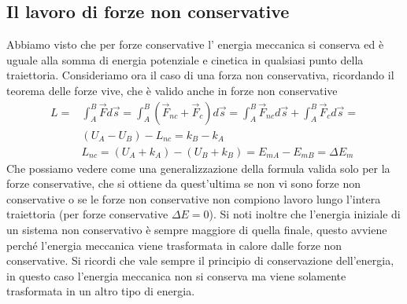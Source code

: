 \documentclass[10pt,a4paper]{article}
\begin{document}
\subsection{Il lavoro di forze non conservative}
Abbiamo visto che per forze conservative l' energia meccanica si conserva ed è uguale alla somma di energia potenziale e cinetica in qualsiasi punto della traiettoria. Consideriamo ora il caso di una forza non conservativa, ricordando il teorema delle forze vive, che è valido anche in forze non conservative
\begin{align*}
	L =& \int_{A}^{B} \vec{F} d\vec{s} = \int_{A}^{B} (\vec{F}_{nc}+\vec{F}_{c}) d\vec{s} = \int_{A}^{B} \vec{F}_{nc} d\vec{s} + \int_{A}^{B} \vec{F}_{c} d\vec{s} =\\
	&(U_A-U_B)-L_{nc} = k_B-k_A\\
	&L_{nc}=(U_A+ k_{A})-(U_B+k_B)=E_{mA}-E_{mB}=\Delta E_m
\end{align*}
Che possiamo vedere come una generalizzazione della formula valida solo per la forze conservative, che si ottiene da quest'ultima se non vi sono forze non conservative o se le forze non conservative non compiono lavoro lungo l'intera traiettoria (per forze conservative $\Delta E = 0$). Si noti inoltre che l'energia iniziale di un sistema non conservativo è sempre maggiore di quella finale, questo avviene perché l'energia meccanica viene trasformata in calore dalle forze non conservative. Si ricordi che vale sempre il principio di conservazione dell'energia, in questo caso l'energia meccanica non si conserva ma viene solamente trasformata in un altro tipo di energia. 
 
\end{document}
